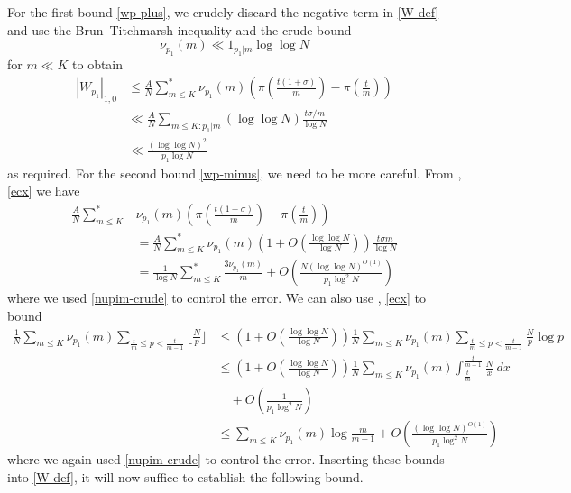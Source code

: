 \documentclass[12pt,a4paper,reqno]{amsart}
\numberwithin{equation}{section}
\theoremstyle{plain}
\theoremstyle{definition}
\begin{document}
For the first bound \eqref{wp-plus}, we crudely discard the negative term in \eqref{W-def} and use the Brun--Titchmarsh inequality and the crude bound
\begin{equation}\label{nupim-crude} 
  \nu_{p_1}(m) \ll 1_{p_1|m} \log\log N
\end{equation}
for $m \ll K$ to obtain
\begin{align*}
|W_{p_1}|_{1,0} &\leq \frac{A}{N} \sum_{m \leq K}^* \nu_{p_1}(m) \left(\pi\left(\frac{t(1+\sigma)}{m}\right) - \pi\left(\frac{t}{m}\right)\right) \\
&\ll \frac{A}{N} \sum_{m \leq K:p_1|m} (\log\log N) \frac{t\sigma/m}{\log N} \\
&\ll \frac{(\log\log N)^2}{p_1 \log N}
\end{align*}
as required.  For the second bound \eqref{wp-minus}, we need to be more careful.  From , \eqref{ecx} we have
\begin{align*}
\frac{A}{N} \sum_{m \leq K}^*& \nu_{p_1}(m) \left(\pi\left(\frac{t(1+\sigma)}{m}\right) - \pi\left(\frac{t}{m}\right)\right) \\
  &= \frac{A}{N} \sum_{m \leq K}^* \nu_{p_1}(m) (1+O(\frac{\log\log N}{\log N})) \frac{t\sigma m}{\log N} \\
  &= \frac{1}{\log N} \sum_{m \leq K}^* \frac{3\nu_{p_1}(m)}{m}
 + O\left(\frac{N (\log\log N)^{O(1)}}{p_1 \log^2 N}\right)
\end{align*}
where we used \eqref{nupim-crude} to control the error.  We can also use , \eqref{ecx} to bound
\begin{align*}
  \frac{1}{N} \sum_{m \leq K} \nu_{p_1}(m) \sum_{\frac{t}{m} \leq p < \frac{t}{m-1}} \lfloor \frac{N}{p} \rfloor
&\leq  \left(1 + O\left(\frac{\log\log N}{\log N}\right)\right)  \frac{1}{N} \sum_{m \leq K} \nu_{p_1}(m)
\sum_{\frac{t}{m} \leq p < \frac{t}{m-1}} \frac{N}{p} \log p \\
&\leq  \left(1 + O\left(\frac{\log\log N}{\log N}\right)\right)  \frac{1}{N} \sum_{m \leq K} \nu_{p_1}(m)
\int_{\frac{t}{m}}^{\frac{t}{m-1}} \frac{N}{x}\ dx\\
&\quad  +
O\left( \frac{1}{p_1 \log^2 N} \right) \\
&\leq \sum_{m \leq K} \nu_{p_1}(m) \log\frac{m}{m-1} +
O\left( \frac{(\log\log N)^{O(1)}}{p_1 \log^2 N} \right) 
\end{align*}
where we again used \eqref{nupim-crude} to control the error.  Inserting these bounds into \eqref{W-def}, it will now suffice to establish the following bound.
\end{document}
